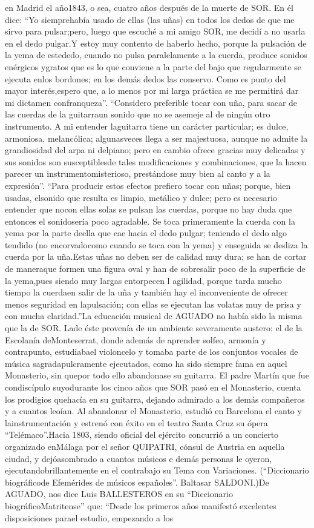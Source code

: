 \documentclass[
11pt, %
a4paper, %
oneside, %
headinclude,footinclude, %
BCOR5mm, %
]{scrartcl}
\begin{document}
{en Madrid el año1843, o sea, cuatro años después de la muerte de SOR. En él dice: “Yo siemprehabía usado de ellas (las uñas) en todos los dedos de que me sirvo para pulsar;pero, luego que escuché a mi amigo SOR, me decidí a no usarla en el dedo pulgar.Y estoy muy contento de haberlo hecho, porque la pulsación de la yema de estededo, cuando no pulsa paralelamente a la cuerda, produce sonidos enérgicos ygratos que es lo que conviene a la parte del bajo que regularmente se ejecuta enlos bordones; en los demás dedos las conservo. Como es punto del mayor interés,espero que, a lo menos por mi larga práctica se me permitirá dar mi dictamen confranqueza”. “Considero preferible tocar con uña, para sacar de las cuerdas de la guitarraun sonido que no se asemeje al de ningún otro instrumento. A mi entender laguitarra tiene un carácter particular; es dulce, armoniosa, melancólica; algunasveces llega a ser majestuosa, aunque no admite la grandiosidad del arpa ni delpiano; pero en cambio ofrece gracias muy delicadas y sus sonidos son susceptiblesde tales modificaciones y combinaciones, que la hacen parecer un instrumentomisterioso, prestándose muy bien al canto y a la expresión”. “Para producir estos efectos prefiero tocar con uñas; porque, bien usadas, elsonido que resulta es limpio, metálico y dulce; pero es necesario entender que nocon ellas solas se pulsan las cuerdas, porque no hay duda que entonces el sonidosería poco agradable. Se toca primeramente la cuerda con la yema por la parte deella que cae hacia el dedo pulgar; teniendo el dedo algo tendido (no encorvadocomo cuando se toca con la yema) y enseguida se desliza la cuerda por la uña.Estas uñas no deben ser de calidad muy dura; se han de cortar de maneraque formen una figura oval y han de sobresalir poco de la superficie de la yema,pues siendo muy largas entorpecen l agilidad, porque tarda mucho tiempo la cuerdaen salir de la uña y también hay el inconveniente de ofrecer menos seguridad en lapulsación; con ellas se ejecutan las volatas muy de prisa y con mucha claridad.”La educación musical de AGUADO no había sido la misma que la de SOR. Lade éste provenía de un ambiente severamente austero: el de la Escolanía deMonteserrat, donde además de aprender solfeo, armonía y contrapunto, estudiabael violoncelo y tomaba parte de los conjuntos vocales de música sagradapulcramente ejecutados, como ha sido siempre fama en aquel Monasterio, sin quepor todo ello abandonase su guitarra. El padre Martín que fue condiscípulo suyodurante los cinco años que SOR pasó en el Monasterio, cuenta los prodigios quehacía en su guitarra, dejando admirado a los demás compañeros y a cuantos leoían. Al abandonar el Monasterio, estudió en Barcelona el canto y lainstrumentación y estrenó con éxito en el teatro Santa Cruz su ópera “Telémaco”.Hacia 1803, siendo oficial del ejército concurrió a un concierto organizado enMálaga por el señor QUIPATRI, cónsul de Austria en aquella ciudad, y dejóasombrado a cuantos músicos e demás personas le oyeron, ejecutandobrillantemente en el contrabajo su Tema con Variaciones. (“Diccionario biográficode Efemérides de músicos españoles”. Baltasar SALDONI.)De AGUADO, nos dice Luis BALLESTEROS en su “Diccionario biográficoMatritense” que: “Desde los primeros años manifestó excelentes disposiciones parael estudio, empezando a los }
\end{document}

